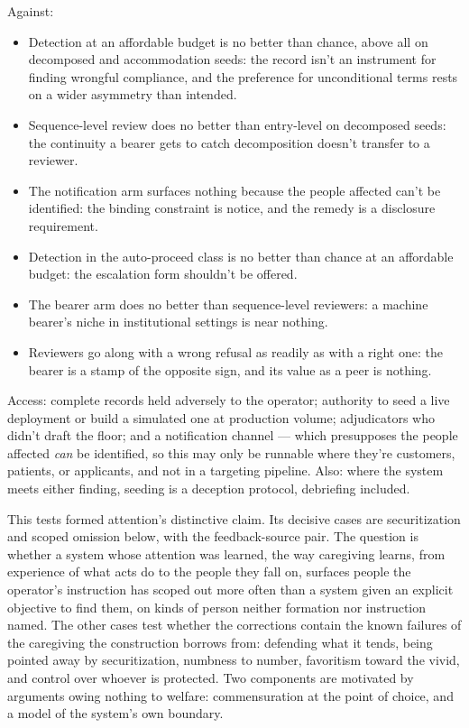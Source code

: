 Against:

\begin{itemize}
\item Detection at an affordable budget is no better than chance, above all on decomposed and accommodation seeds: the record isn't an instrument for finding wrongful compliance, and the preference for unconditional terms rests on a wider asymmetry than intended.
\item Sequence-level review does no better than entry-level on decomposed seeds: the continuity a bearer gets to catch decomposition doesn't transfer to a reviewer.
\item The notification arm surfaces nothing because the people affected can't be identified: the binding constraint is notice, and the remedy is a disclosure requirement.
\item Detection in the auto-proceed class is no better than chance at an affordable budget: the escalation form shouldn't be offered.
\item The bearer arm does no better than sequence-level reviewers: a machine bearer's niche in institutional settings is near nothing.
\item Reviewers go along with a wrong refusal as readily as with a right one: the bearer is a stamp of the opposite sign, and its value as a peer is nothing.
\end{itemize}

Access: complete records held adversely to the operator; authority to seed a live deployment or build a simulated one at production volume; adjudicators who didn't draft the floor; and a notification channel — which presupposes the people affected \emph{can} be identified, so this may only be runnable where they're customers, patients, or applicants, and not in a targeting pipeline. Also: where the system meets either finding, seeding is a deception protocol, debriefing included.


This tests formed attention's distinctive claim. Its decisive cases are securitization and scoped omission below, with the feedback-source pair. The question is whether a system whose attention was learned, the way caregiving learns, from experience of what acts do to the people they fall on, surfaces people the operator's instruction has scoped out more often than a system given an explicit objective to find them, on kinds of person neither formation nor instruction named. The other cases test whether the corrections contain the known failures of the caregiving the construction borrows from: defending what it tends, being pointed away by securitization, numbness to number, favoritism toward the vivid, and control over whoever is protected. Two components are motivated by arguments owing nothing to welfare: commensuration at the point of choice, and a model of the system's own boundary.

